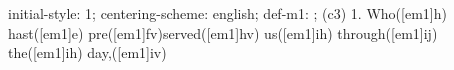 initial-style: 1;
centering-scheme: english;
def-m1: \grealign;
(c3) 1. Who([em1]h) hast([em1]e) pre([em1]fv)served([em1]hv) us([em1]ih) through([em1]ij) the([em1]ih) day,([em1]iv)